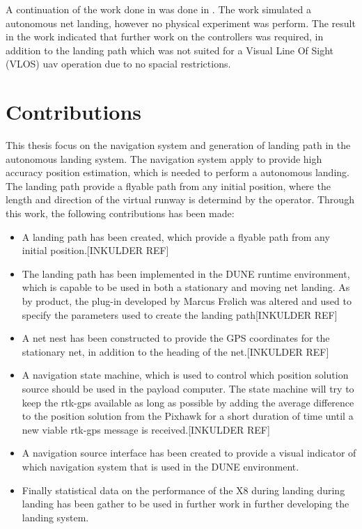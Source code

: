 A continuation of the work done in \citep{Skulstad&Syversen} was done in \citep{Froelich}. The work simulated a autonomous net landing, however no physical experiment was perform. The result in the work indicated that further work on the controllers was required, in addition to the landing path which was not suited for a Visual Line Of Sight  (VLOS) \gls{uav} operation due to no spacial restrictions.
\section{Contributions}
This thesis focus on the navigation system and generation of landing path in the autonomous landing system. The navigation system apply  to provide high accuracy position estimation, which is needed to perform a autonomous landing. The landing path provide a flyable path from any initial position, where the length and direction of the virtual runway is determind by the operator. Through this work, the following contributions has been made:
\begin{itemize}
\item A landing path has been created, which provide a flyable path from any initial position.[INKULDER REF]
\item The landing path has been implemented in the DUNE runtime environment, which is capable to be used in both a stationary and moving net landing. As by product, the plug-in developed by Marcus Frølich \citep{Froelich} was altered and used to specify the parameters used to create the landing path[INKULDER REF]
\item A net nest has been constructed to provide the GPS coordinates for the stationary net, in addition to the heading of the net.[INKULDER REF]
\item A navigation state machine, which is used to control which position solution source should be used in the payload computer. The state machine will try to keep the \gls{rtk-gps} available as long as possible by adding the average difference to the position solution from the Pixhawk for a short duration of time until a new viable \gls{rtk-gps} message is received.[INKULDER REF]
\item  A navigation source interface has been created to provide a visual indicator of which navigation system that is used in the DUNE environment.
\item Finally statistical data on the performance of the X8 during landing during landing has been gather to be used in further work in further developing the landing system.
\end{itemize}
\cleardoublepage